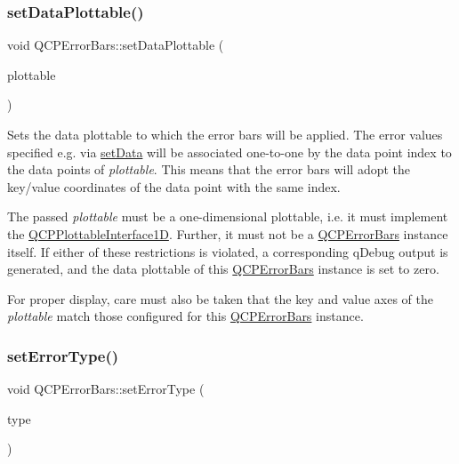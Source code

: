 \subsubsection{\texorpdfstring{set\+Data\+Plottable()}{setDataPlottable()}}
{\footnotesize\ttfamily void Q\+C\+P\+Error\+Bars\+::set\+Data\+Plottable (\begin{DoxyParamCaption}\item[{\hyperlink{class_q_c_p_abstract_plottable}{Q\+C\+P\+Abstract\+Plottable} $\ast$}]{plottable }\end{DoxyParamCaption})}

Sets the data plottable to which the error bars will be applied. The error values specified e.\+g. via \hyperlink{class_q_c_p_error_bars_a92b1980003255f5f7c05407a4d92aabc}{set\+Data} will be associated one-\/to-\/one by the data point index to the data points of {\itshape plottable}. This means that the error bars will adopt the key/value coordinates of the data point with the same index.

The passed {\itshape plottable} must be a one-\/dimensional plottable, i.\+e. it must implement the \hyperlink{class_q_c_p_plottable_interface1_d}{Q\+C\+P\+Plottable\+Interface1D}. Further, it must not be a \hyperlink{class_q_c_p_error_bars}{Q\+C\+P\+Error\+Bars} instance itself. If either of these restrictions is violated, a corresponding q\+Debug output is generated, and the data plottable of this \hyperlink{class_q_c_p_error_bars}{Q\+C\+P\+Error\+Bars} instance is set to zero.

For proper display, care must also be taken that the key and value axes of the {\itshape plottable} match those configured for this \hyperlink{class_q_c_p_error_bars}{Q\+C\+P\+Error\+Bars} instance. \mbox{\label{class_q_c_p_error_bars_af0af493d454a8f3a0908830160680d2b}} 
\subsubsection{\texorpdfstring{set\+Error\+Type()}{setErrorType()}}
{\footnotesize\ttfamily void Q\+C\+P\+Error\+Bars\+::set\+Error\+Type (\begin{DoxyParamCaption}\item[{\hyperlink{class_q_c_p_error_bars_a95f0220f11a72648b96480a85ce26474}{Error\+Type}}]{type }\end{DoxyParamCaption})}

